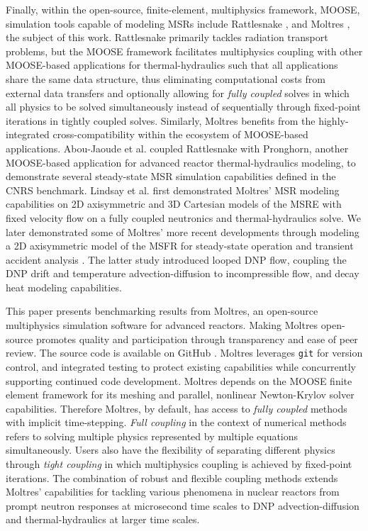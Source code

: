 Finally, within the open-source, finite-element, multiphysics framework, MOOSE,
simulation tools capable of modeling
\glspl{MSR} include Rattlesnake \cite{wang_rattlesnake_2021}, and Moltres
\cite{lindsay_moltres_2017}, the subject of this work.
Rattlesnake primarily tackles radiation transport problems, but the MOOSE
framework facilitates multiphysics coupling
with other MOOSE-based applications for thermal-hydraulics
such that all applications share the same data structure, thus eliminating
computational costs from external data transfers and optionally allowing for
\textit{fully coupled} solves in which all physics to be solved simultaneously
instead of sequentially through fixed-point iterations in tightly coupled
solves. Similarly, Moltres benefits from the highly-integrated
cross-compatibility
within the ecosystem of MOOSE-based applications. Abou-Jaoude et al.
\cite{abou-jaoude_coupled_2020} coupled Rattlesnake with Pronghorn, another
MOOSE-based application for advanced reactor thermal-hydraulics modeling, to
demonstrate several steady-state \gls{MSR} simulation capabilities defined in
the \gls{CNRS} benchmark. Lindsay et al.
\cite{lindsay_introduction_2018} first demonstrated Moltres' \gls{MSR} modeling
capabilities on 2D axisymmetric and 3D Cartesian models of the \gls{MSRE} with
fixed velocity flow on a fully coupled neutronics and thermal-hydraulics solve.
We later demonstrated some of Moltres' more recent developments through
modeling a 2D axisymmetric model of the \gls{MSFR} for steady-state operation
and transient accident analysis \cite{park_advancement_2020}. The latter study
introduced looped \gls{DNP} flow, coupling the \gls{DNP} drift and temperature 
advection-diffusion to incompressible flow, and decay heat modeling
capabilities.

This paper presents benchmarking results from Moltres, an open-source
multiphysics simulation software for advanced reactors. Making Moltres
open-source promotes quality and participation through transparency and
ease of peer review. The source code \citep{lindsay_moltres_2017} is available
on GitHub \citep{github_build_2017}. Moltres leverages \texttt{git} for
version control, and integrated testing to protect existing capabilities while
concurrently supporting continued code development. Moltres depends on the
\gls{MOOSE} finite element framework for its meshing and parallel, nonlinear
Newton-Krylov solver capabilities. Therefore Moltres, by default, has access to
\textit{fully coupled} methods with implicit time-stepping.
\textit{Full coupling} in the context of numerical methods refers to
solving multiple physics represented by multiple equations simultaneously.
Users also have the flexibility of separating different physics through
\textit{tight coupling} in which multiphysics coupling is achieved by
fixed-point iterations. The combination of robust and flexible coupling
methods extends Moltres' capabilities for tackling various phenomena in
nuclear reactors from prompt neutron responses at microsecond time scales to
\gls{DNP} advection-diffusion and thermal-hydraulics at larger time scales.

